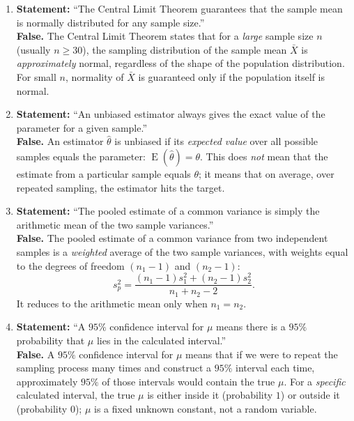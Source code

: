 \documentclass[11pt]{article}
\begin{document}
\begin{corrige}
\begin{enumerate}
\item \textbf{Statement:} ``The Central Limit Theorem guarantees that the sample mean is normally distributed for any sample size.'' \\
\textbf{False.} The Central Limit Theorem states that for a \emph{large} sample size \(n\) (usually \(n \ge 30\)), the sampling distribution of the sample mean \(\bar{X}\) is \emph{approximately} normal, regardless of the shape of the population distribution. For small \(n\), normality of \(\bar{X}\) is guaranteed only if the population itself is normal.

\item \textbf{Statement:} ``An unbiased estimator always gives the exact value of the parameter for a given sample.'' \\
\textbf{False.} An estimator \(\hat{\theta}\) is unbiased if its \emph{expected value} over all possible samples equals the parameter: \(\operatorname{E}(\hat{\theta}) = \theta\). This does \emph{not} mean that the estimate from a particular sample equals \(\theta\); it means that on average, over repeated sampling, the estimator hits the target.

\item \textbf{Statement:} ``The pooled estimate of a common variance is simply the arithmetic mean of the two sample variances.'' \\
\textbf{False.} The pooled estimate of a common variance from two independent samples is a \emph{weighted} average of the two sample variances, with weights equal to the degrees of freedom \((n_1-1)\) and \((n_2-1)\):
\[
s_p^2 = \frac{(n_1-1)s_1^2 + (n_2-1)s_2^2}{n_1+n_2-2}.
\]
It reduces to the arithmetic mean only when \(n_1 = n_2\).

\item \textbf{Statement:} ``A \(95\%\) confidence interval for \(\mu\) means there is a \(95\%\) probability that \(\mu\) lies in the calculated interval.'' \\
\textbf{False.} A \(95\%\) confidence interval for \(\mu\) means that if we were to repeat the sampling process many times and construct a \(95\%\) interval each time, approximately \(95\%\) of those intervals would contain the true \(\mu\). For a \emph{specific} calculated interval, the true \(\mu\) is either inside it (probability \(1\)) or outside it (probability \(0\)); \(\mu\) is a fixed unknown constant, not a random variable.
\end{enumerate}
\end{corrige}
\end{document}
